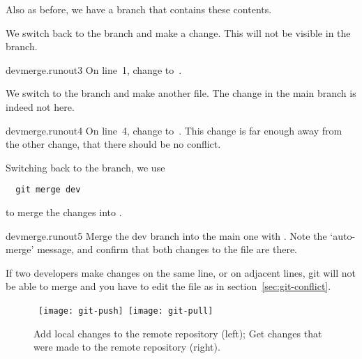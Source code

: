Also as before, we have a  branch that contains
these contents.


We switch back to the  branch and make a change.
This will not be visible in the  branch.

\begin{gitstep}{devmerge.runout3}
  On line~1, change  to~.
\end{gitstep}

We switch to the  branch and make another file.
The change in the main branch is indeed not here.

\begin{gitstep}{devmerge.runout4}
  On line~4, change  to~.
  This change is far enough away from the other change,
  that there should be no conflict.
\end{gitstep}

Switching back to the  branch, we use
\begin{lstlisting}
  git merge dev
\end{lstlisting}
to merge the  changes into .

\begin{gitstep}{devmerge.runout5}
  Merge the dev branch into the main one with .
  Note the `auto-merge' message,
  and confirm that both changes to the file are there.
\end{gitstep}

If two developers make changes on the same line, or on adjacent lines,
git will not be able to merge
and you have to edit the file as in section~\ref{sec:git-conflict}.

\begin{figure}[ht]
  \hbox{
  \texttt{[image: git-push]}
  \texttt{[image: git-pull]}
  }
  \caption{Add local changes to the remote repository (left);
    Get changes that were made to the remote repository (right).}
  \label{fig:git-push}
  \label{fig:git-pull}
\end{figure}

\endinput

\Level 0 {Conflicts}

\begin{purpose}
  In this section you will learn about how do deal with conflicting
  edits by two users of the same repository.
\end{purpose}

